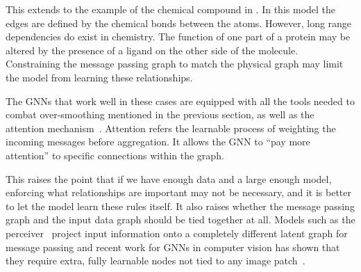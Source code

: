 This extends to the example of the chemical compound in .
In this model the edges are defined by the chemical bonds between the atoms.
However, long range dependencies do exist in chemistry.
The function of one part of a protein may be altered by the presence of a ligand on the other side of the molecule.
Constraining the message passing graph to match the physical graph may limit the model from learning these relationships.

The GNNs that work well in these cases are equipped with all the tools needed to combat over-smoothing mentioned in the previous section, as well as the attention mechanism~\cite{Attention}.
Attention refers the learnable process of weighting the incoming messages before aggregation.
It allows the GNN to ``pay more attention'' to specific connections within the graph.

This raises the point that if we have enough data and a large enough model, enforcing what relationships are important may not be necessary, and it is better to let the model learn these rules itself.
It also raises whether the message passing graph and the input data graph should be tied together at all.
Models such as the perceiver~\cite{Perceiver} project input information onto a completely different latent graph for message passing and recent work for GNNs in computer vision has shown that they require extra, fully learnable nodes not tied to any image patch~\cite{VisionTransformersNeed}.

